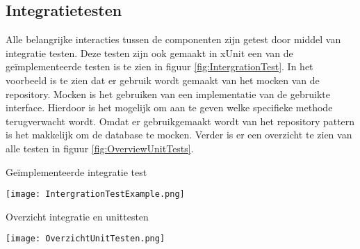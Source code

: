 \subsection{Integratietesten}
Alle belangrijke interacties tussen de componenten zijn getest door middel van integratie testen.
Deze testen zijn ook gemaakt in xUnit een van de geïmplementeerde testen is te zien in figuur \ref{fig:IntergrationTest}.
In het voorbeeld is te zien dat er gebruik wordt gemaakt van het mocken van de repository.
Mocken is het gebruiken van een  implementatie van de gebruikte interface. 
Hierdoor is het mogelijk om aan te geven welke specifieke methode terugverwacht wordt.
Omdat er gebruikgemaakt wordt van het repository pattern is het makkelijk om de database te mocken.
Verder is er een overzicht te zien van alle testen in figuur \ref{fig:OverviewUnitTests}.


\whitespace[2]
\begin{graphic}
	\captionsetup{type=figure}
	\caption{Geïmplementeerde integratie test}
	\texttt{[image: IntergrationTestExample.png]}
	\label{fig:IntergrationTest}
\end{graphic}

\whitespace[2]
\begin{graphic}
	\captionsetup{type=figure}
	\caption{Overzicht integratie en unittesten}
	\texttt{[image: OverzichtUnitTesten.png]}
	\label{fig:OverviewUnitTests}
\end{graphic}
